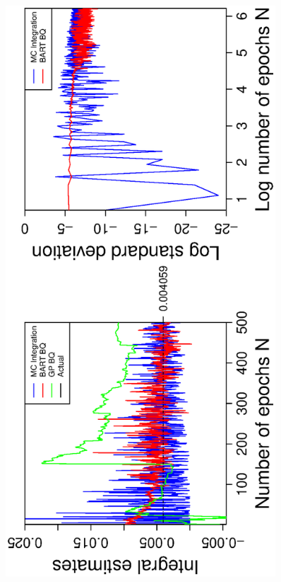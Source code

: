 \vspace{-0.5cm}
\begin{figure}[H]
  \centering
  \hspace{-1.6cm}
  \begin{minipage}[b]{0.4\textwidth}
    \includegraphics[width = 0.9\textwidth, angle = -90]{report/Figures/4/convergenceMean43Dimensions.eps}

\end{minipage}
\end{figure}
